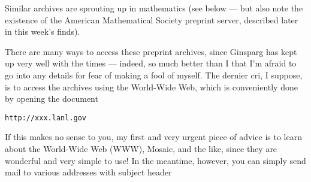 \documentclass{article}
\def\tightlist{}
\renewcommand{\texttt}[1]{%
  \begingroup
  \ttfamily
  \begingroup\lccode`~=`/\lowercase{\endgroup\def~}{/\discretionary{}{}{}}%
  \begingroup\lccode`~=`[\lowercase{\endgroup\def~}{[\discretionary{}{}{}}%
  \begingroup\lccode`~=`.\lowercase{\endgroup\def~}{.\discretionary{}{}{}}%
  \catcode`/=\active\catcode`[=\active\catcode`.=\active
  \scantokens{#1\noexpand}%
  \endgroup
}
\begin{document}

Similar archives are sprouting up in mathematics (see below --- but also
note the existence of the American Mathematical Society preprint server,
described later in this week's finds).

There are many ways to access these preprint archives, since Ginsparg
has kept up very well with the times --- indeed, so much better than I
that I'm afraid to go into any details for fear of making a fool of
myself. The dernier cri, I suppose, is to access the archives using the
World-Wide Web, which is conveniently done by opening the document

\begin{verbatim}
http://xxx.lanl.gov
\end{verbatim}

If this makes no sense to you, my first and very urgent piece of advice
is to learn about the World-Wide Web (WWW), Mosaic, and the like, since
they are wonderful and very simple to use! In the meantime, however, you
can simply send mail to various addresses with subject header
\end{document}
